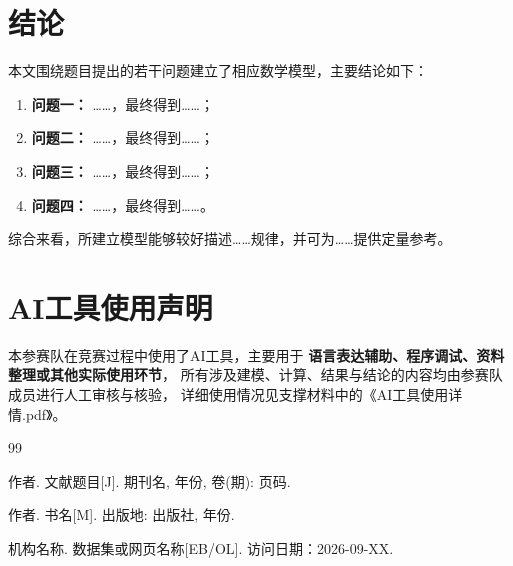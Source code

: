 \documentclass[UTF8,fontset=none,a4paper,12pt]{ctexart}
\begin{document}
\section{结论}

本文围绕题目提出的若干问题建立了相应数学模型，主要结论如下：

\begin{enumerate}
  \item \textbf{问题一：} ……，最终得到……；
  \item \textbf{问题二：} ……，最终得到……；
  \item \textbf{问题三：} ……，最终得到……；
  \item \textbf{问题四：} ……，最终得到……。
\end{enumerate}

综合来看，所建立模型能够较好描述……规律，并可为……提供定量参考。


\section*{AI工具使用声明}

本参赛队在竞赛过程中使用了AI工具，主要用于
\textbf{语言表达辅助、程序调试、资料整理或其他实际使用环节}，
所有涉及建模、计算、结果与结论的内容均由参赛队成员进行人工审核与核验，
详细使用情况见支撑材料中的《AI工具使用详情.pdf》。



\begin{thebibliography}{99}

作者.
\newblock 文献题目[J].
\newblock 期刊名, 年份, 卷(期): 页码.

作者.
\newblock 书名[M].
\newblock 出版地: 出版社, 年份.

机构名称.
\newblock 数据集或网页名称[EB/OL].
\newblock 访问日期：2026-09-XX.

\end{thebibliography}
\end{document}
